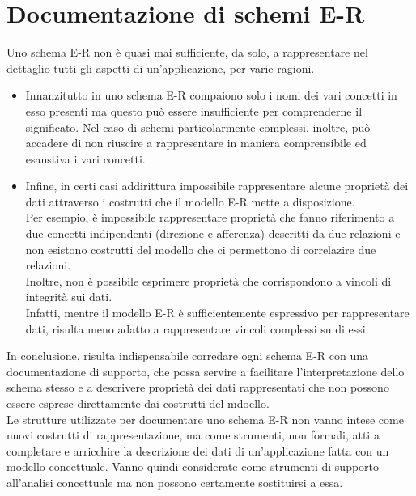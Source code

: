 \section{Documentazione di schemi E-R}
Uno schema E-R non è quasi mai sufficiente, da solo, a rappresentare nel dettaglio tutti gli aspetti di un'applicazione, per varie ragioni.
    \begin{itemize}
        \item{Innanzitutto in uno schema E-R compaiono solo i nomi dei vari concetti in esso presenti ma questo può essere insufficiente per comprenderne il significato.}
        {Nel caso di schemi particolarmente complessi, inoltre, può accadere di non riuscire a rappresentare in maniera comprensibile ed esaustiva i vari concetti.}
        \item{Infine, in certi casi addirittura impossibile rappresentare alcune proprietà dei dati attraverso i costrutti che il modello E-R mette a disposizione.\\
        Per esempio, è impossibile rappresentare proprietà che fanno riferimento a due concetti indipendenti (direzione e afferenza) descritti da due relazioni e non esistono costrutti del modello che ci permettono di correlazire due relazioni.\\
        Inoltre, non è possibile esprimere proprietà che corrispondono a vincoli di integrità sui dati.\\
        Infatti, mentre il modello E-R è sufficientemente espressivo per rappresentare dati, risulta meno adatto a rappresentare vincoli complessi su di essi.}
    \end{itemize}
In conclusione, risulta indispensabile corredare ogni schema E-R con una documentazione di supporto, che possa servire a facilitare l'interpretazione dello schema stesso e a descrivere proprietà dei dati rappresentati che non possono essere esprese direttamente dai costrutti del mdoello.\\
Le strutture utilizzate per documentare uno schema E-R non vanno intese come nuovi costrutti di rappresentazione, ma come strumenti, non formali, atti a completare e arricchire la descrizione dei dati di un'applicazione fatta con un modello concettuale.
Vanno quindi considerate come strumenti di supporto all'analisi concettuale ma non possono certamente sostituirsi a essa.

